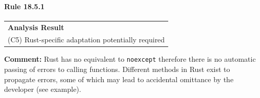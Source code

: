 \paragraph{Rule 18.5.1}
\begin{longtable}{p{13cm}}
\textbf{Analysis Result} \\
(C5) Rust-specific adaptation potentially required \\
\end{longtable}
\textbf{Comment:} Rust has no equivalent to \texttt{noexcept} therefore there is no automatic passing of errors to calling functions. Different methods in Rust exist to propagate errors, some of which may lead to accidental omittance by the developer (see example). \\



